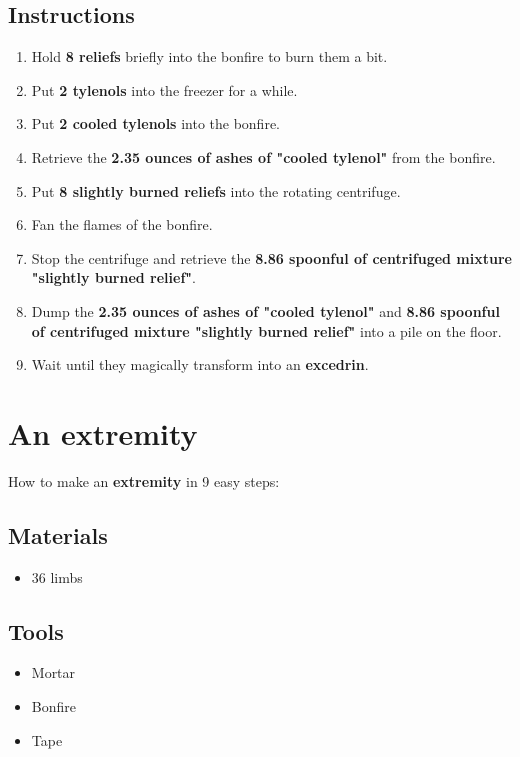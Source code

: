 \documentclass{article}
\begin{document}
\subsection{Instructions}\begin{enumerate}
\item 
Hold \textbf{8 reliefs} briefly into the bonfire to burn them a bit.
\item 
Put \textbf{2 tylenols} into the freezer for a while.
\item 
Put \textbf{2 cooled tylenols} into the bonfire.
\item 
Retrieve the \textbf{2.35 ounces of ashes of "cooled tylenol"} from the bonfire.
\item 
Put \textbf{8 slightly burned reliefs} into the rotating centrifuge.
\item 
Fan the flames of the bonfire.
\item 
Stop the centrifuge and retrieve the \textbf{8.86 spoonful of centrifuged mixture "slightly burned relief"}.
\item 
Dump the \textbf{2.35 ounces of ashes of "cooled tylenol"} and \textbf{8.86 spoonful of centrifuged mixture "slightly burned relief"} into a pile on the floor.
\item 
Wait until they magically transform into an \textbf{excedrin}.
\end{enumerate}
\newpage
\section{An extremity}How to make an \textbf{extremity} in 9 easy steps:

\subsection{Materials}\begin{itemize}
\item 
36 limbs
\end{itemize}
\subsection{Tools}\begin{itemize}
\item 
Mortar
\item 
Bonfire
\item 
Tape
\end{itemize}
\end{document}
